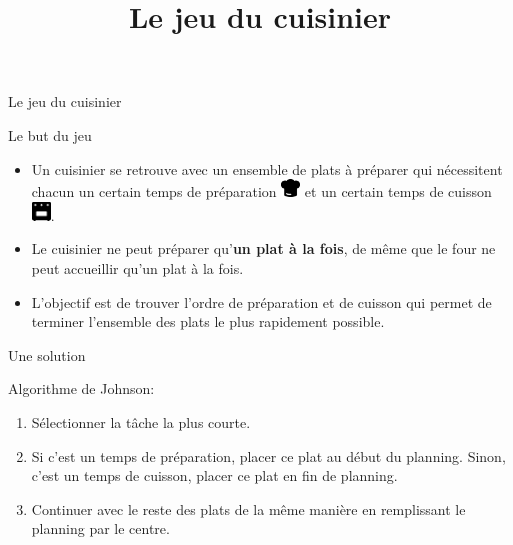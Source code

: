 \documentclass[landscape]{beamer}
\title{Le jeu du cuisinier}
\date{}
\begin{document}


\begin{frame}{Le jeu du cuisinier}

\begin{block}{Le but du jeu}

\begin{itemize}
\item Un cuisinier se retrouve avec un ensemble de plats à préparer qui nécessitent chacun un certain temps de préparation \includegraphics[width=0.5cm]{icons/toque.png} et un certain temps de cuisson \includegraphics[width=0.5cm]{icons/four.png}. 

\item
Le cuisinier ne peut préparer qu'\textbf{un plat à la fois}, de même que le four ne peut accueillir qu'un plat à la fois.

\item
L'objectif est de trouver l'ordre de préparation et de cuisson qui permet de terminer l'ensemble des plats le plus rapidement possible.
\end{itemize}

\end{block}

\end{frame}


\begin{frame}{Une solution}



\begin{block}{Algorithme de Johnson:}

\begin{enumerate}
\item Sélectionner la tâche la plus courte.
\item Si c'est un temps de préparation, placer ce plat au début du planning. Sinon, c'est un temps de cuisson, placer ce plat en fin de planning.
\item Continuer avec le reste des plats de la même manière en remplissant le planning par le centre.
\end{enumerate}

\end{block}


\end{frame}
\end{document}
